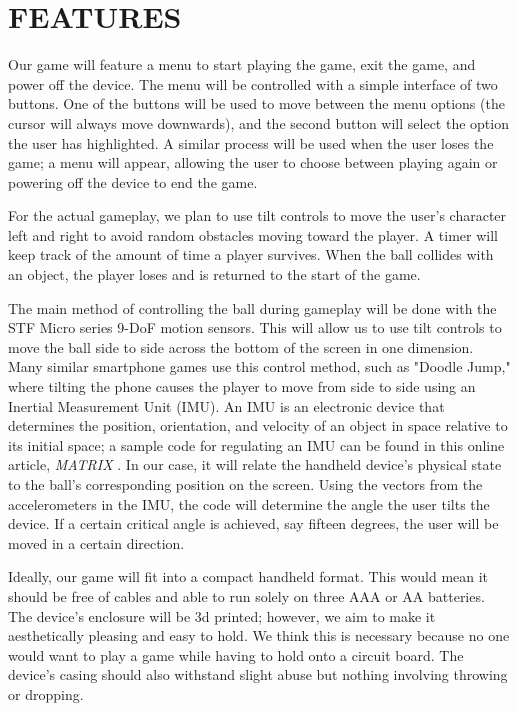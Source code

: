 \documentclass[12pt]{article}
\begin{document}
\newpage
\section{FEATURES}
Our game will feature a menu to start playing the game, exit the game, and power off the device. The menu will be controlled with a simple interface of two buttons. One of the buttons will be used to move between the menu options (the cursor will always move downwards), and the second button will select the option the user has highlighted. A similar process will be used when the user loses the game; a menu will appear, allowing the user to choose between playing again or powering off the device to end the game.

For the actual gameplay, we plan to use tilt controls to move the user's character left and right to avoid random obstacles moving toward the player. A timer will keep track of the amount of time a player survives. When the ball collides with an object, the player loses and is returned to the start of the game.

The main method of controlling the ball during gameplay will be done with the STF Micro series 9-DoF motion sensors. This will allow us to use tilt controls to move the ball side to side across the bottom of the screen in one dimension. Many similar smartphone games use this control method, such as "Doodle Jump," where tilting the phone causes the player to move from side to side using an Inertial Measurement Unit (IMU). An IMU is an electronic device that determines the position, orientation, and velocity of an object in space relative to its initial space; a sample code for regulating an IMU can be found in this online article, \textit{MATRIX} \parencite{github}. In our case, it will relate the handheld device's physical state to the ball's corresponding position on the screen. Using the vectors from the accelerometers in the IMU, the code will determine the angle the user tilts the device. If a certain critical angle is achieved, say fifteen degrees, the user will be moved in a certain direction.

Ideally, our game will fit into a compact handheld format. This would mean it should be free of cables and able to run solely on three AAA or AA batteries. The device's enclosure will be 3d printed; however, we aim to make it aesthetically pleasing and easy to hold. We think this is necessary because no one would want to play a game while having to hold onto a circuit board. The device's casing should also withstand slight abuse but nothing involving throwing or dropping.
\end{document}
